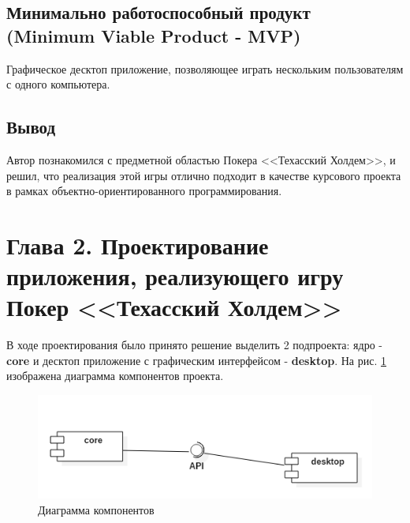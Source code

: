 \subsection*{Минимально работоспособный продукт (Minimum Viable Product - MVP)}

 Графическое десктоп приложение, позволяющее играть нескольким пользователям с одного компьютера.

\subsection*{Вывод}

Автор познакомился с предметной областью Покера <<Техасский Холдем>>, и решил, что реализация этой игры отлично подходит в качестве курсового проекта в рамках объектно-ориентированного программирования.

\section*{Глава 2. Проектирование приложения, реализующего игру Покер <<Техасский Холдем>>}


В ходе проектирования было принято решение выделить 2 подпроекта: ядро - \textbf{core} и десктоп приложение с графическим интерфейсом - \textbf{desktop}. На рис. \ref{pic:component} изображена диаграмма компонентов проекта.

\begin{figure}[H]
	\begin{center}
		\includegraphics[scale=1]{pics/component_diagram.png}
	    \caption{Диаграмма компонентов} 
		\label{pic:component}
	\end{center}
\end{figure}


